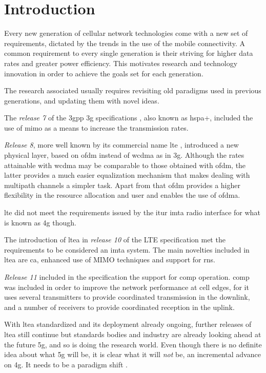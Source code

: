 \chapter{Introduction}\label{ch:intro}

Every new generation of cellular network technologies come with a new set of
requirements, dictated by the trends in the use of the mobile connectivity. A
common requirement to every single generation is their striving for higher data
rates and greater power efficiency. This motivates research and technology
innovation in order to achieve the goals set for each generation.


The research associated usually requires revisiting old paradigms used in
previous generations, and updating them with novel ideas.


The \emph{release 7} of the \gls{3gpp} \gls{3g} specifications \cite{3gpprel7},
also known as \gls{hspa+}, included the use of \gls{mimo} as a means to increase
the transmission rates.


\emph{Release 8}, more well known by its commercial name \gls{lte}
\cite{3gpplte}, introduced a new physical layer, based on \gls{ofdm} instead of
\gls{wcdma} as in \gls{3g}. Although the rates attainable with \gls{wcdma} may
be comparable to those obtained with \gls{ofdm}, the latter provides a much
easier equalization mechanism that makes dealing with multipath channels a
simpler task. Apart from that \gls{ofdm} provides a higher flexibility in the
resource allocation and user and enables the use of \gls{ofdma}.

\gls{lte} did not meet the requirements issued by the \gls{itur} \gls{imta}
radio interface \cite{imta} for what is known as \gls{4g} though.

The introduction of \gls{ltea} in \emph{release 10} of the LTE specification
\cite{3gppltea} met the requirements to be considered an \gls{imta} system. The
main novelties included in \gls{ltea} are \gls{ca}, enhanced use of MIMO
techniques and support for \glspl{rn}.

\emph{Release 11} \cite{3gpprel11} included in the specification the support for
\gls{comp} operation. \gls{comp} was included in order to improve the network
performance at cell edges, for it uses several transmitters to provide
coordinated transmission in the downlink, and a number of receivers to provide
coordinated reception in the uplink.

With \gls{ltea} standardized and its deployment already ongoing, further
releases of \gls{ltea} still continue but standards bodies and industry are
already looking ahead at the future \gls{5g}, and so is doing the research
world. Even though there is no definite idea about what \gls{5g} will be, it is 
clear what it will \emph{not} be, an incremental advance on \gls{4g}. It needs
to be a paradigm shift \cite{andrews14}.

